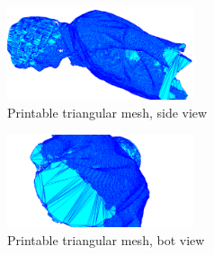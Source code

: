 \begin{figure}[ht!]
  \centering
    \includegraphics[width=0.49\textwidth]		{figures/3dMesh_sundin_zoom_side.png}
    \caption{Printable triangular mesh, side view}
    \label{fig:sundin-side-zoom}
\end{figure}

\begin{figure}[ht!]
  \centering
    \includegraphics[width=0.49\textwidth]{figures/3dMesh_sundin_zoom_bot.png}
    \caption{Printable triangular mesh, bot view}
    \label{fig:sundin-bot-zoom}
\end{figure}